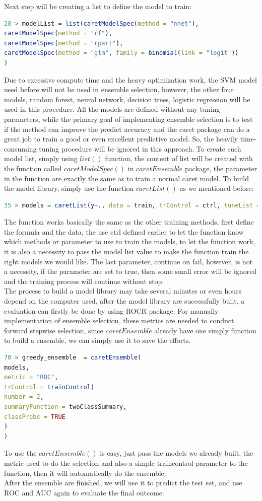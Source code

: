\documentclass[12pt, a4paper, bibliography=totoc, english]{scrartcl}
\begin{document}
Next step will be creating a list to define the model to train:
\begin{lstlisting}[language = R]
28 > modelList = list(caretModelSpec(method = "nnet"),
caretModelSpec(method = "rf"),
caretModelSpec(method = "rpart"),
caretModelSpec(method = "glm", family = binomial(link = "logit"))
)

\end{lstlisting}
Due to excessive compute time and the heavy optimization work, the SVM model used before will not be used in ensemble selection, however, the other four models, random forest, neural network, decision trees, logistic regression will be used in this procedure. All the models are defined without any tuning parameters, while the primary goal of implementing ensemble selection is to test if the method can improve the predict accuracy and the caret package can do a great job to train a good or even excellent predictive model. So, the heavily time-consuming tuning procedure will be ignored in this approach. To create such model list, simply using $list()$ function, the content of list will be created with the function called $caretModelSpec()$ in $caretEnsemble$ package, the parameter in the function are exactly the same as to train a normal caret model.\indent
To build the model library, simply use the function $caretList()$ as we mentioned before:
\begin{lstlisting}[language = R]
35 > models = caretList(y~., data = train, trControl = ctrl, tuneList = modelList, continue_on_fail = F)
\end{lstlisting}
The function works basically the same as the other training methods, first define the formula and the data, the use ctrl defined earlier to let the function know which methods or parameter to use to train the models, to let the function work, it is also a necessity to pass the model list value to make the function train the right models we would like. The last parameter, continue on fail, however, is not a necessity, if the parameter are set to true, then some small error will be ignored and the training process will continue without stop.\\
The process to build a model library may take several minutes or even hours depend on the computer used, after the model library are successfully built, a evaluation can firstly be done by using ROCR package. For manually implementation of ensemble selection, these metrics are needed to conduct forward stepwise selection, since $caretEnsemble$ already have one simply function to build a ensemble, we can simply use it to save the efforts.
\begin{lstlisting}[language = R]
70 > greedy_ensemble  = caretEnsemble(
models,
metric = "ROC",
trControl = trainControl(
number = 2,
summaryFunction = twoClassSummary,
classProbs = TRUE
)
)
\end{lstlisting}
To use the $caretEnsemble()$ is easy, just pass the models we already built, the metric used to do the selection and also a simple traincontrol parameter to the function, then it will automatically do the ensemble.\\
After the ensemble are finished, we will use it to predict the test set, and use ROC and AUC again to evaluate the final outcome.
\end{document}
